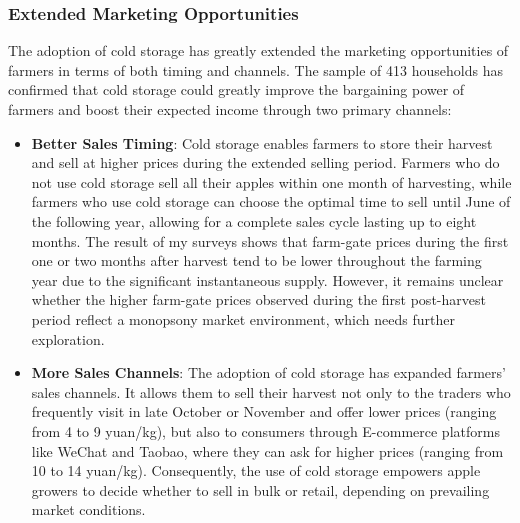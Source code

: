 \documentclass[12pt]{article}
\begin{document}
\subsubsection{Extended Marketing Opportunities}
\noindent The adoption of cold storage has greatly extended the marketing opportunities of farmers in terms of both timing and channels. The sample of 413 households has confirmed that cold storage could greatly improve the bargaining power of farmers and boost their expected income through two primary channels:
\begin{itemize}
    \item \textbf{Better Sales Timing}: Cold storage enables farmers to store their harvest and sell at higher prices during the extended selling period. Farmers who do not use cold storage sell all their apples within one month of harvesting, while farmers who use cold storage can choose the optimal time to sell until June of the following year, allowing for a complete sales cycle lasting up to eight months. The result of my surveys shows that farm-gate prices during the first one or two months after harvest tend to be lower throughout the farming year due to the significant instantaneous supply. However, it remains unclear whether the higher farm-gate prices observed during the first post-harvest period reflect a monopsony market environment, which needs further exploration.
    
    \item \textbf{More Sales Channels}: The adoption of cold storage has expanded farmers' sales channels. It allows them to sell their harvest not only to the traders who frequently visit in late October or November and offer lower prices (ranging from 4 to 9 yuan/kg), but also to consumers through E-commerce platforms like WeChat and Taobao, where they can ask for higher prices (ranging from 10 to 14 yuan/kg). Consequently, the use of cold storage empowers apple growers to decide whether to sell in bulk or retail, depending on prevailing market conditions.
\end{itemize}


\end{document}
